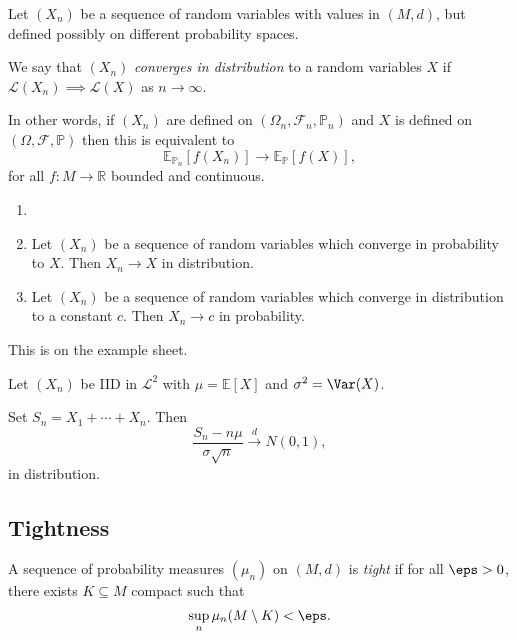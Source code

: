 \documentclass[12pt]{article}
\begin{document}
\begin{definition}
	Let $(X_n)$ be a sequence of random variables with values in $(M, d)$, but defined possibly on different probability spaces.

	We say that $(X_n)$ \emph{converges in distribution} to a random variables $X$ if $\mathcal{L}(X_n) \implies \mathcal{L}(X)$ as $n \to \infty$.

	In other words, if $(X_n)$ are defined on $(\Omega_n, \mathcal{F}_n, \mathbb{P}_n)$ and $X$ is defined on $(\Omega, \mathcal{F}, \mathbb{P})$ then this is equivalent to
	\[
	\mathbb{E}_{\mathbb{P}_n}[f(X_n)] \to \mathbb{E}_{\mathbb{P}}[f(X)],
	\]
	for all $f : M \to \mathbb{R}$ bounded and continuous.
\end{definition}

\begin{proposition}
	\begin{enumerate}[\normalfont(i)]
		\item[]
		\item Let $(X_n)$ be a sequence of random variables which converge in probability to $X$. Then $X_n \to X$ in distribution.
		\item Let $(X_n)$ be a sequence of random variables which converge in distribution to a constant $c$. Then $X_n \to c$ in probability.
	\end{enumerate}
\end{proposition}

\begin{proofbox}
	This is on the example sheet.
\end{proofbox}

\begin{exbox}
	Let $(X_n)$ be IID in $\mathcal{L}^2$ with $\mu = \mathbb{E}[X]$ and $\sigma^2 = \Var(X)$.

	Set $S_n = X_1 + \cdots + X_n$. Then
	\[
	\frac{S_n - n\mu}{\sigma \sqrt n} \overset d\to N(0,1),
	\]
	in distribution.
\end{exbox}

\subsection{Tightness}%
\label{sub:tight}

\begin{definition}
	A sequence of probability measures $(\mu_n)$ on $(M, d)$ is \emph{tight} if for all $\eps > 0$, there exists $K \subseteq M$ compact such that
	\[
	\sup_n \mu_n (M \setminus K) < \eps.
	\]
\end{definition}
\end{document}
